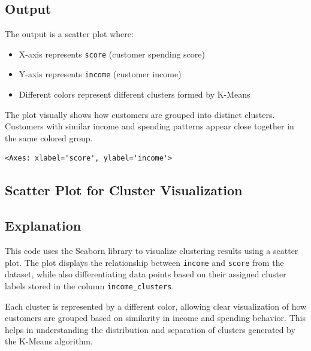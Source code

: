 \documentclass[11pt,a4paper]{report}
\makeatletter
\newcommand{\boxspacing}{\kern\kvtcb@left@rule\kern\kvtcb@boxsep}
\newcommand{\prompt}[4]{
        {\ttfamily\llap{{\color{#2}[#3]:\hspace{3pt}#4}}\vspace{-\baselineskip}}
    }
\makeatother
\begin{document}
\subsection*{Output}
The output is a scatter plot where:
\begin{itemize}
    \item X-axis represents \texttt{score} (customer spending score)
    \item Y-axis represents \texttt{income} (customer income)
    \item Different colors represent different clusters formed by K-Means
\end{itemize}

The plot visually shows how customers are grouped into distinct clusters. Customers with similar income and spending patterns appear close together in the same colored group.
            \begin{tcolorbox}[breakable, size=fbox, boxrule=.5pt, pad at break*=1mm, opacityfill=0]
\prompt{Out}{outcolor}{18}{\boxspacing}
\begin{Verbatim}[commandchars=\\\{\}]
<Axes: xlabel='score', ylabel='income'>
\end{Verbatim}
\end{tcolorbox}
        
    \begin{center}
    \end{center}
    

\subsection{Scatter Plot for Cluster Visualization}

\subsection*{Explanation}
This code uses the Seaborn library to visualize clustering results using a scatter plot. The plot displays the relationship between \texttt{income} and \texttt{score} from the dataset, while also differentiating data points based on their assigned cluster labels stored in the column \texttt{income\_clusters}.

Each cluster is represented by a different color, allowing clear visualization of how customers are grouped based on similarity in income and spending behavior. This helps in understanding the distribution and separation of clusters generated by the K-Means algorithm.
\end{document}
